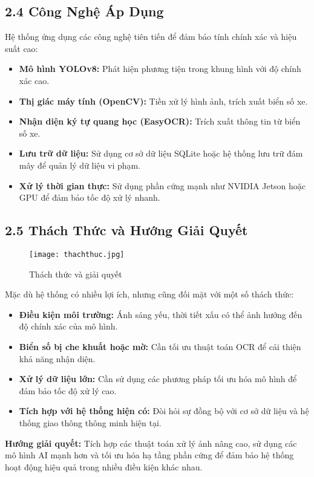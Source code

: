 \documentclass[conference]{IEEEtran}
\begin{document}
\subsection{2.4 Công Nghệ Áp Dụng}
Hệ thống ứng dụng các công nghệ tiên tiến để đảm bảo tính chính xác và hiệu suất cao:
\begin{itemize}
    \item \textbf{Mô hình YOLOv8:} Phát hiện phương tiện trong khung hình với độ chính xác cao.
    \item \textbf{Thị giác máy tính (OpenCV):} Tiền xử lý hình ảnh, trích xuất biển số xe.
    \item \textbf{Nhận diện ký tự quang học (EasyOCR):} Trích xuất thông tin từ biển số xe.
    \item \textbf{Lưu trữ dữ liệu:} Sử dụng cơ sở dữ liệu SQLite hoặc hệ thống lưu trữ đám mây để quản lý dữ liệu vi phạm.
    \item \textbf{Xử lý thời gian thực:} Sử dụng phần cứng mạnh như NVIDIA Jetson hoặc GPU để đảm bảo tốc độ xử lý nhanh.
\end{itemize}

\subsection{2.5 Thách Thức và Hướng Giải Quyết}
\begin{figure}[H]
    \centering
    \texttt{[image: thachthuc.jpg]} %
    \caption{Thách thức và giải quyết}
    \label{fig:traffic_monitoring}
\end{figure}
Mặc dù hệ thống có nhiều lợi ích, nhưng cũng đối mặt với một số thách thức:
\begin{itemize}
    \item \textbf{Điều kiện môi trường:} Ánh sáng yếu, thời tiết xấu có thể ảnh hưởng đến độ chính xác của mô hình.
    \item \textbf{Biển số bị che khuất hoặc mờ:} Cần tối ưu thuật toán OCR để cải thiện khả năng nhận diện.
    \item \textbf{Xử lý dữ liệu lớn:} Cần sử dụng các phương pháp tối ưu hóa mô hình để đảm bảo tốc độ xử lý cao.
    \item \textbf{Tích hợp với hệ thống hiện có:} Đòi hỏi sự đồng bộ với cơ sở dữ liệu và hệ thống giao thông thông minh hiện tại.
\end{itemize}

\textbf{Hướng giải quyết:} Tích hợp các thuật toán xử lý ảnh nâng cao, sử dụng các mô hình AI mạnh hơn và tối ưu hóa hạ tầng phần cứng để đảm bảo hệ thống hoạt động hiệu quả trong nhiều điều kiện khác nhau.
\end{document}
